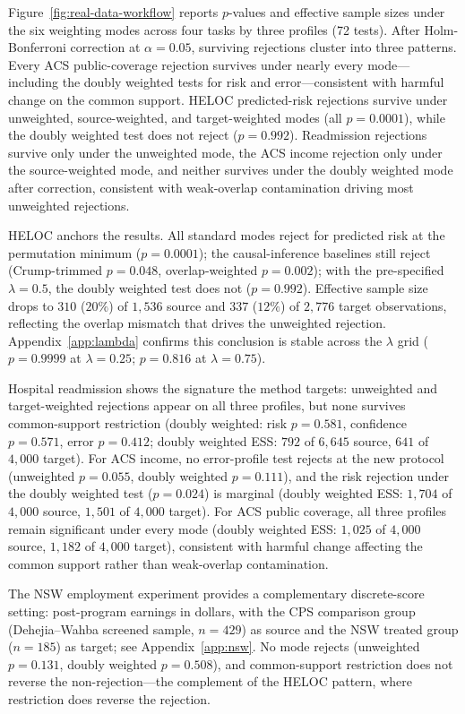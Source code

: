 Figure~\ref{fig:real-data-workflow} reports $p$-values and effective sample sizes under the six weighting modes across four tasks by three profiles (72 tests). After Holm-Bonferroni correction at $\alpha = 0.05$, surviving rejections cluster into three patterns. Every ACS public-coverage rejection survives under nearly every mode---including the doubly weighted tests for risk and error---consistent with harmful change on the common support. HELOC predicted-risk rejections survive under unweighted, source-weighted, and target-weighted modes (all $p = 0.0001$), while the doubly weighted test does not reject ($p = 0.992$). Readmission rejections survive only under the unweighted mode, the ACS income rejection only under the source-weighted mode, and neither survives under the doubly weighted mode after correction, consistent with weak-overlap contamination driving most unweighted rejections.

HELOC anchors the results. All standard modes reject for predicted risk at the permutation minimum ($p = 0.0001$); the causal-inference baselines still reject (Crump-trimmed $p = 0.048$, overlap-weighted $p = 0.002$); with the pre-specified $\lambda = 0.5$, the doubly weighted test does not ($p = 0.992$). Effective sample size drops to $310$ ($20\%$) of $1{,}536$ source and $337$ ($12\%$) of $2{,}776$ target observations, reflecting the overlap mismatch that drives the unweighted rejection. Appendix~\ref{app:lambda} confirms this conclusion is stable across the $\lambda$ grid ($p = 0.9999$ at $\lambda = 0.25$; $p = 0.816$ at $\lambda = 0.75$).

Hospital readmission shows the signature the method targets: unweighted and target-weighted rejections appear on all three profiles, but none survives common-support restriction (doubly weighted: risk $p = 0.581$, confidence $p = 0.571$, error $p = 0.412$; doubly weighted ESS: $792$ of $6{,}645$ source, $641$ of $4{,}000$ target). For ACS income, no error-profile test rejects at the new protocol (unweighted $p = 0.055$, doubly weighted $p = 0.111$), and the risk rejection under the doubly weighted test ($p = 0.024$) is marginal (doubly weighted ESS: $1{,}704$ of $4{,}000$ source, $1{,}501$ of $4{,}000$ target). For ACS public coverage, all three profiles remain significant under every mode (doubly weighted ESS: $1{,}025$ of $4{,}000$ source, $1{,}182$ of $4{,}000$ target), consistent with harmful change affecting the common support rather than weak-overlap contamination.

The NSW employment experiment provides a complementary discrete-score setting: post-program earnings in dollars, with the CPS comparison group (Dehejia--Wahba screened sample, $n=429$) as source and the NSW treated group ($n=185$) as target; see Appendix~\ref{app:nsw}. No mode rejects (unweighted $p=0.131$, doubly weighted $p=0.508$), and common-support restriction does not reverse the non-rejection---the complement of the HELOC pattern, where restriction does reverse the rejection.

